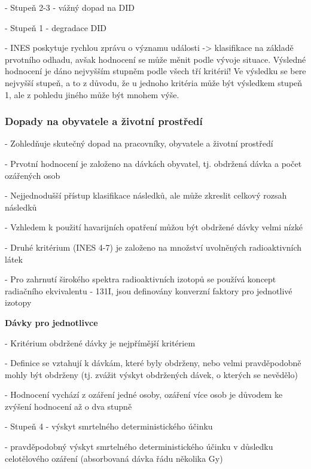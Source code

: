 \noindent - 	Stupeň 2-3 - vážný dopad na DID

\noindent - 	Stupeň 1 - degradace DID

\noindent - 	INES poskytuje rychlou zprávu o významu události -> klasifikace na základě prvotního odhadu, avšak hodnocení se může měnit podle vývoje situace. Výsledné hodnocení je dáno nejvyšším stupněm podle všech tří kritérií! Ve výsledku se bere nejvyšší stupeň, a to z důvodu, že u jednoho kritéria může být výsledkem stupeň 1, ale z pohledu jiného může být mnohem výše.


\subsubsection{Dopady na obyvatele a životní prostředí}

\noindent - 	Zohledňuje skutečný dopad na pracovníky, obyvatele a životní prostředí

\noindent - 	Prvotní hodnocení je založeno na dávkách obyvatel, tj. obdržená dávka a počet ozářených osob

\noindent - 	Nejjednodušší přístup klasifikace následků, ale může zkreslit celkový rozsah následků

\noindent - 	Vzhledem k použití havarijních opatření můžou být obdržené dávky velmi nízké

\noindent - 	Druhé kritérium (INES 4-7) je založeno na množství uvolněných radioaktivních látek

\noindent - 	Pro zahrnutí širokého spektra radioaktivních izotopů se používá koncept radiačního ekvivalentu - 131I, jsou definovány konverzní faktory pro jednotlivé izotopy

\vspace{8pt}
\textbf{Dávky pro jednotlivce}

\noindent - 	Kritérium obdržené dávky je nejpřímější kritériem

\noindent - 	Definice se vztahují k dávkám, které byly obdrženy, nebo velmi pravděpodobně mohly být obdrženy (tj. zvážit výskyt obdržených dávek, o kterých se nevědělo)

\noindent - 	Hodnocení vychází z ozáření jedné osoby, ozáření více osob je důvodem ke zvýšení hodnocení až o dva stupně

\noindent - 	Stupeň 4 - výskyt smrtelného deterministického účinku

-	pravděpodobný výskyt smrtelného deterministického účinku v důsledku celotělového ozáření (absorbovaná dávka řádu několika Gy)

